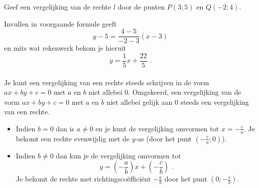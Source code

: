 \begin{voorbeeld}
Geef een vergelijking van de rechte $l$ door de punten $P(3;5)$ en $Q(-2;4)$.



Invullen in voorgaande formule geeft
\[
y-5=\frac{4-5}{-2-3}(x-3)
\]
en mits wat rekenwerk bekom je hieruit
\[
y=\frac{1}{5}x+\frac{22}{5} \text { .}
\]\\

Je kunt een vergelijking van een rechte steeds schrijven in de vorm $ax+by+c=0$ met $a$ en $b$ niet allebei 0.
Omgekeerd, een vergelijking van de vorm $ax+by+c=0$ met $a$ en $b$ niet allebei gelijk aan 0 steeds een vergelijking van een rechte.
\begin{itemize}
\item Indien $b=0$ dan is $a \neq 0$ en je kunt de vergelijking omvormen tot $x=-\frac{c}{a}$.
Je bekomt een rechte evenwijdig met de $y$-as (door het punt $(-\frac{c}{a};0)$).
\item Indien $b \neq 0$ dan kun je de vergelijking omvormen tot
\[
y=\left( -\frac{a}{b}  \right)x+\left(  -\frac{c}{b} \right) \text { .}
\]
Je bekomt de rechte met richtingsco\"effici\"ent $-\frac {a}{b}$ door het punt $(0; -\frac{c}{b})$.
\end{itemize}

\end{voorbeeld}